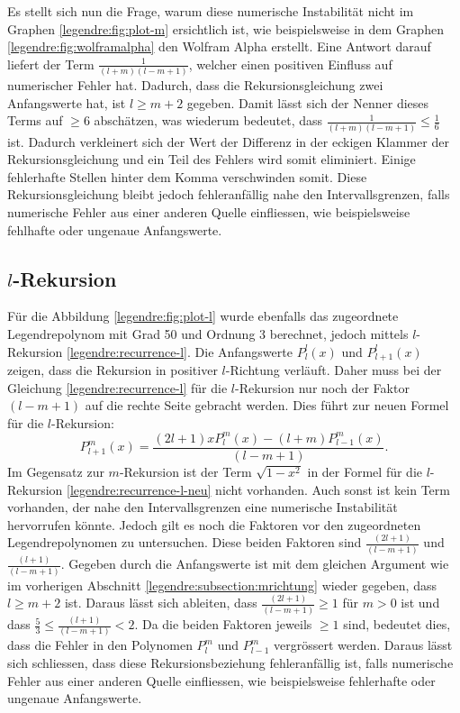 Es stellt sich nun die Frage, warum diese numerische Instabilität nicht im Graphen \ref{legendre:fig:plot-m} ersichtlich ist, wie beispielsweise in dem Graphen \ref{legendre:fig:wolframalpha} den Wolfram Alpha erstellt.
Eine Antwort darauf liefert der Term $\frac{1}{(l+m)(l-m+1)}$, welcher einen positiven Einfluss auf numerischer Fehler hat.
Dadurch, dass die Rekursionsgleichung zwei Anfangswerte hat, ist $l\geq m+2$ gegeben.
Damit lässt sich der Nenner dieses Terms auf $\geq 6$ abschätzen, was wiederum bedeutet, dass $\frac{1}{(l+m)(l-m+1)} \leq \frac{1}{6}$ ist.
Dadurch verkleinert sich der Wert der Differenz in der eckigen Klammer der Rekursionsgleichung und ein Teil des Fehlers wird somit eliminiert.
Einige fehlerhafte Stellen hinter dem Komma verschwinden somit.
Diese Rekursionsgleichung bleibt jedoch fehleranfällig nahe den Intervallsgrenzen, falls numerische Fehler aus einer anderen Quelle einfliessen, wie beispielsweise fehlhafte oder ungenaue Anfangswerte.

\subsection{$l$-Rekursion
\label{legendre:subsection:lrichtung}}
Für die Abbildung \ref{legendre:fig:plot-l} wurde ebenfalls das zugeordnete Legendrepolynom mit Grad 50 und Ordnung 3 berechnet, jedoch mittels $l$-Rekursion \eqref{legendre:recurrence-l}.
Die Anfangswerte $P^{l}_{l}(x)$ und $P^{l}_{l+1}(x)$ zeigen, dass die Rekursion in positiver $l$-Richtung verläuft.
Daher muss bei der Gleichung \eqref{legendre:recurrence-l} für die $l$-Rekursion nur noch der Faktor $(l-m+1)$ auf die rechte Seite gebracht werden.
Dies führt zur neuen Formel für die $l$-Rekursion: 
\begin{equation}
P^{m}_{l+1}(x)
= \frac{(2l+1)xP^{m}_{l}(x)-(l+m)P^{m}_{l-1}(x)}{(l-m+1)} .
\label{legendre:recurrence-l-neu}
\end{equation}
Im Gegensatz zur $m$-Rekursion ist der Term $\sqrt{1-x^2}$ in der Formel für die $l$-Rekursion \eqref{legendre:recurrence-l-neu} nicht vorhanden.
Auch sonst ist kein Term vorhanden, der nahe den Intervallsgrenzen eine numerische Instabilität hervorrufen könnte.
Jedoch gilt es noch die Faktoren vor den zugeordneten Legendrepolynomen zu untersuchen.
Diese beiden Faktoren sind $\frac{(2l+1)}{(l-m+1)}$ und $\frac{(l+1)}{(l-m+1)}$.
Gegeben durch die Anfangswerte ist mit dem gleichen Argument wie im vorherigen Abschnitt \ref{legendre:subsection:mrichtung} wieder gegeben, dass $l\geq m+2$ ist.
Daraus lässt sich ableiten, dass $\frac{(2l+1)}{(l-m+1)}\geq 1$ für $m>0$ ist und dass $\frac{5}{3}\leq \frac{(l+1)}{(l-m+1)}<2$.
Da die beiden Faktoren jeweils $\geq 1$ sind, bedeutet dies, dass die Fehler in den Polynomen $P^{m}_{l}$ und $P^{m}_{l-1}$ vergrössert werden.
Daraus lässt sich schliessen, dass diese Rekursionsbeziehung fehleranfällig ist, falls numerische Fehler aus einer anderen Quelle einfliessen, wie beispielsweise fehlerhafte oder ungenaue Anfangswerte.

